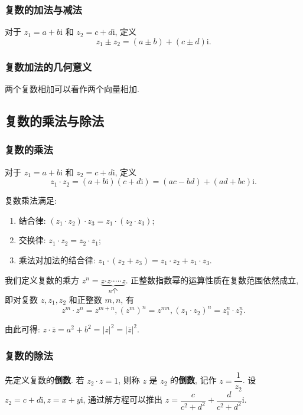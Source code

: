 \documentclass[titlepage]{ctexart}
\begin{document}
\subsubsection{复数的加法与减法}

对于 $z_1 = a + b\mathrm{i}$ 和 $z_2 = c + d\mathrm{i}$, 定义
\[
z_1 \pm z_2 = (a \pm b) + (c \pm d)\mathrm{i}.
\]

\subsubsection{复数加法的几何意义}

两个复数相加可以看作两个向量相加.

\subsection{复数的乘法与除法}

\subsubsection{复数的乘法}

对于 $z_1 = a + b\mathrm{i}$ 和 $z_2 = c + d\mathrm{i}$, 定义
\[
z_1 \cdot z_2 = (a + b\mathrm{i})(c + d\mathrm{i}) = (ac - bd) + (ad + bc)\mathrm{i}.
\]

复数乘法满足:
\begin{enumerate}
    \item[(1)] 结合律: $(z_1 \cdot z_2) \cdot z_3 = z_1 \cdot (z_2 \cdot z_3)$;
    \item[(2)] 交换律: $z_1 \cdot z_2 = z_2 \cdot z_1$;
    \item[(3)] 乘法对加法的结合律: $z_1 \cdot (z_2 + z_3) = z_1 \cdot z_2 + z_1 \cdot z_3$.
\end{enumerate}

我们定义复数的乘方 $z^n = \underbrace{z \boldsymbol{\cdot} z \boldsymbol{\cdot} \cdots \boldsymbol{\cdot} z}_{n\text{个}}.$
正整数指数幂的运算性质在复数范围依然成立, 即对复数 $z, z_1, z_2$ 和正整数 $m, n$, 有
\[
z^m \cdot z^n = z^{m+n}, (z^m)^n = z^{mn}, (z_1 \cdot z_2)^n = z_1^n \cdot z_2^n.
\]

由此可得: $z \cdot \bar{z} = a^2 + b^2 = |z|^2 = |\bar{z}|^2$.

\subsubsection{复数的除法}

先定义复数的\textbf{倒数}. 若 $z_2 \cdot z =1$, 则称 $z$ 是 $z_2$ 的\textbf{倒数}, 记作 $z = \dfrac{1}{z_2}$.
设 $z_2 = c + d\mathrm{i}, z = x + y\mathrm{i}$, 通过解方程可以推出 $z = \dfrac{c}{c^2+d^2} + \dfrac{d}{c^2+d^2}\mathrm{i}.$
\end{document}
